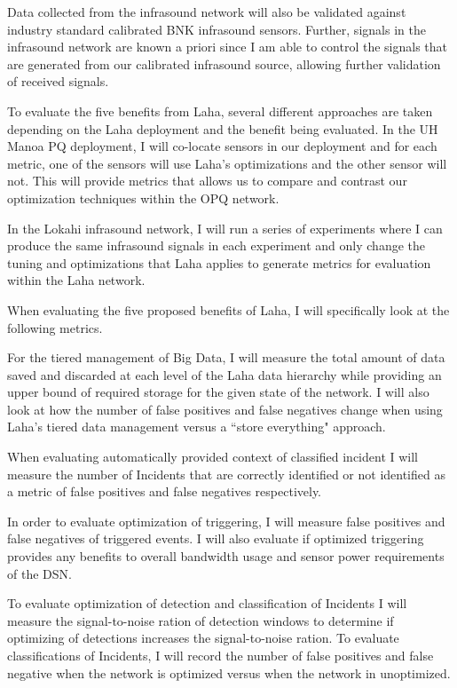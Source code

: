 Data collected from the infrasound network will also be validated against industry standard calibrated BNK infrasound sensors. Further, signals in the infrasound network are known a priori since I am able to control the signals that are generated from our calibrated infrasound source, allowing further validation of received signals.

To evaluate the five benefits from Laha, several different approaches are taken depending on the Laha deployment and the benefit being evaluated. In the UH Manoa PQ deployment, I will co-locate sensors in our deployment and for each metric, one of the sensors will use Laha's optimizations and the other sensor will not. This will provide metrics that allows us to compare and contrast our optimization techniques within the OPQ network. 

In the Lokahi infrasound network, I will run a series of experiments where I can produce the same infrasound signals in each experiment and only change the tuning and optimizations that Laha applies to generate metrics for evaluation within the Laha network.

When evaluating the five proposed benefits of Laha, I will specifically look at the following metrics. 

For the tiered management of Big Data, I will measure the total amount of data saved and discarded at each level of the Laha data hierarchy while providing an upper bound of required storage for the given state of the network. I will also look at how the number of false positives and false negatives change when using Laha's tiered data management versus a ``store everything" approach. 

When evaluating automatically provided context of classified incident I will measure the number of Incidents that are correctly identified or not identified as a metric of false positives and false negatives respectively.

In order to evaluate optimization of triggering, I will measure false positives and false negatives of triggered events. I will also evaluate if optimized triggering provides any benefits to overall bandwidth usage and sensor power requirements of the DSN.

To evaluate optimization of detection and classification of Incidents I will measure the signal-to-noise ration of detection windows to determine if optimizing of detections increases the signal-to-noise ration. To evaluate classifications of Incidents, I will record the number of false positives and false negative when the network is optimized versus when the network in unoptimized.

